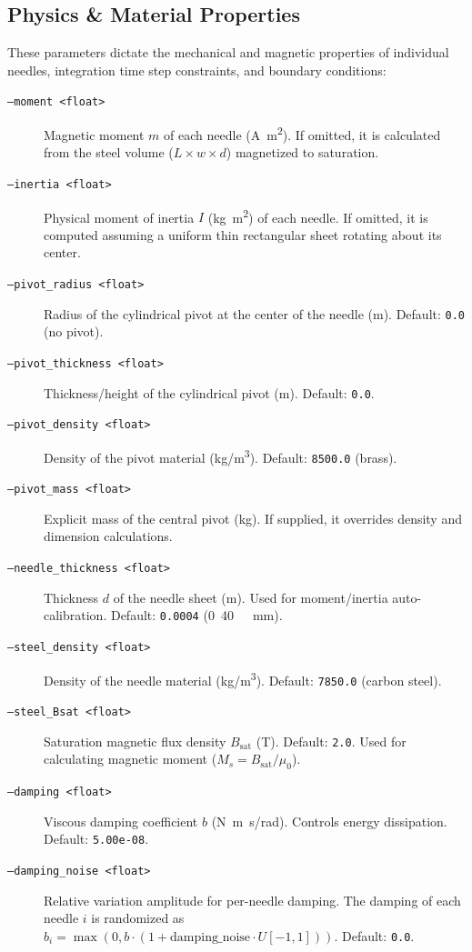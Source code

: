 \documentclass[11pt,a4paper]{article}
\newcommand{\code}[1]{\texttt{#1}}
\begin{document}
\subsection{Physics \& Material Properties}
These parameters dictate the mechanical and magnetic properties of individual needles, integration time step constraints, and boundary conditions:
\begin{description}
    \item[\code{--moment <float>}] Magnetic moment $m$ of each needle (\si{A.m^2}). If omitted, it is calculated from the steel volume ($L \times w \times d$) magnetized to saturation.
    \item[\code{--inertia <float>}] Physical moment of inertia $I$ (\si{kg.m^2}) of each needle. If omitted, it is computed assuming a uniform thin rectangular sheet rotating about its center.
    \item[\code{--pivot\_radius <float>}] Radius of the cylindrical pivot at the center of the needle (\si{m}). Default: \code{0.0} (no pivot).
    \item[\code{--pivot\_thickness <float>}] Thickness/height of the cylindrical pivot (\si{m}). Default: \code{0.0}.
    \item[\code{--pivot\_density <float>}] Density of the pivot material (\si{kg/m^3}). Default: \code{8500.0} (brass).
    \item[\code{--pivot\_mass <float>}] Explicit mass of the central pivot (\si{kg}). If supplied, it overrides density and dimension calculations.
    \item[\code{--needle\_thickness <float>}] Thickness $d$ of the needle sheet (\si{m}). Used for moment/inertia auto-calibration. Default: \code{0.0004} (\si{0.40\ mm}).
    \item[\code{--steel\_density <float>}] Density of the needle material (\si{kg/m^3}). Default: \code{7850.0} (carbon steel).
    \item[\code{--steel\_Bsat <float>}] Saturation magnetic flux density $B_{\text{sat}}$ (\si{T}). Default: \code{2.0}. Used for calculating magnetic moment ($M_s = B_{\text{sat}} / \mu_0$).
    \item[\code{--damping <float>}] Viscous damping coefficient $b$ (\si{N.m.s/rad}). Controls energy dissipation. Default: \code{5.00e-08}.
    \item[\code{--damping\_noise <float>}] Relative variation amplitude for per-needle damping. The damping of each needle $i$ is randomized as $b_i = \max(0, b \cdot (1 + \text{damping\_noise} \cdot U[-1, 1]))$. Default: \code{0.0}.

\end{description}
\end{document}
